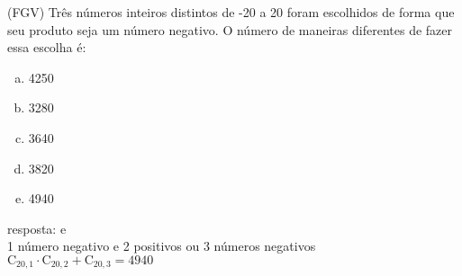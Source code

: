 \begin{ex}
 (FGV) Três números inteiros distintos de -20 a 20 foram escolhidos de forma que seu produto seja um número negativo. O número de maneiras diferentes de fazer essa escolha é:
    \begin{enumerate}[(a)]
    \item 4250
    \item 3280
    \item 3640
    \item 3820
    \item 4940
    \end{enumerate}
      \begin{sol}
        resposta: e  \\
        1 número negativo e 2 positivos ou 3 números negativos \\
        $\mathrm{C}_{{20},1}\cdot\mathrm{C}_{{20},2}+\mathrm{C}_{{20},3}=4940$
      \end{sol}
\end{ex}